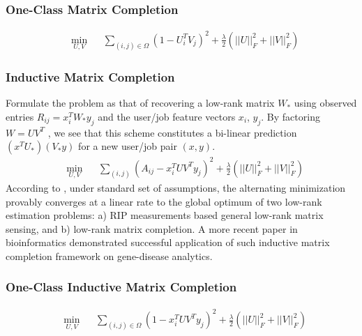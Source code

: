 \documentclass{article} %
\newtheorem{remark}{Remark}
\begin{document}
\subsubsection{One-Class Matrix Completion}
\begin{equation}
    \begin{aligned}
        &\min_{U,V} 
        && \sum_{(i,j)\in \Omega} (1 - U_i^T V_j)^2
        + \frac{\lambda}{2}(||U||_F^2 + ||V||_F^2)
    \end{aligned}
\end{equation}
\subsubsection{Inductive Matrix Completion}
Formulate the problem as that of recovering a low-rank matrix $W_*$ using
observed entries $R_{ij} = x_i^T W_{*} y_j$ and the user/job feature vectors $x_i$, $y_j$. By
factoring $W = U V^T$ , we see that this scheme constitutes a bi-linear
prediction $(x^T U_{*})(V_{*} y)$ for a new user/job pair $(x, y)$.
\begin{equation}
    \begin{aligned}
        &\min_{U,V} &&\sum_{(i,j)} (A_{ij} - x_i^TUV^Ty_j)^2 
        + \frac{\lambda}{2}(||U||_F^2 + ||V||_F^2)
    \end{aligned}
\end{equation}
According to \cite{jain2013provable}, under standard set of assumptions,
the alternating minimization provably converges at a linear rate to the global
optimum of two low-rank estimation problems: a) RIP measurements based general
low-rank matrix sensing, and b) low-rank matrix completion. A more recent
paper \cite{natarajan2014inductive} in bioinformatics demonstrated successful
application of such inductive matrix completion
framework on gene-disease analytics.

\subsubsection{One-Class Inductive Matrix Completion}
\begin{equation}
    \begin{aligned}
        &\min_{U,V} &&\sum_{(i,j)\in\Omega} (1 - x_i^TUV^Ty_j)^2 
        + \frac{\lambda}{2}(||U||_F^2 + ||V||_F^2)
    \end{aligned}
\end{equation}
\end{document}
